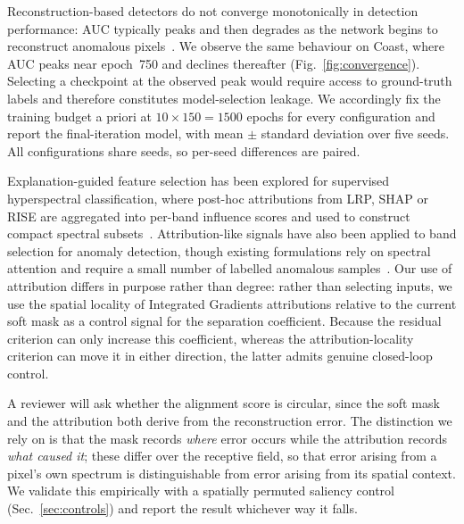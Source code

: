
Reconstruction-based detectors do not converge monotonically in detection
performance: AUC typically peaks and then degrades as the network begins to
reconstruct anomalous pixels~\cite{cui2025imp}. We observe the same behaviour
on Coast, where AUC peaks near epoch~750 and declines thereafter
(Fig.~\ref{fig:convergence}). Selecting a checkpoint at the observed peak
would require access to ground-truth labels and therefore constitutes
model-selection leakage. We accordingly fix the training budget a priori at
$10 \times 150 = 1500$ epochs for every configuration and report the
final-iteration model, with mean $\pm$ standard deviation over five seeds.
All configurations share seeds, so per-seed differences are paired.


Explanation-guided feature selection has been explored for supervised
hyperspectral classification, where post-hoc attributions from LRP, SHAP or
RISE are aggregated into per-band influence scores and used to construct
compact spectral subsets~\cite{haidar2025xaibs}. Attribution-like signals have
also been applied to band selection for anomaly detection, though existing
formulations rely on spectral attention and require a small number of labelled
anomalous samples~\cite{adbsnet2025}. Our use of attribution differs in
purpose rather than degree: rather than selecting inputs, we use the spatial
locality of Integrated Gradients attributions relative to the current soft
mask as a control signal for the separation coefficient. Because the residual
criterion can only increase this coefficient, whereas the attribution-locality
criterion can move it in either direction, the latter admits genuine
closed-loop control.


A reviewer will ask whether the alignment score is circular, since the soft
mask and the attribution both derive from the reconstruction error. The
distinction we rely on is that the mask records \emph{where} error occurs
while the attribution records \emph{what caused it}; these differ over the
receptive field, so that error arising from a pixel's own spectrum is
distinguishable from error arising from its spatial context. We validate this
empirically with a spatially permuted saliency control (Sec.~\ref{sec:controls})
and report the result whichever way it falls.
